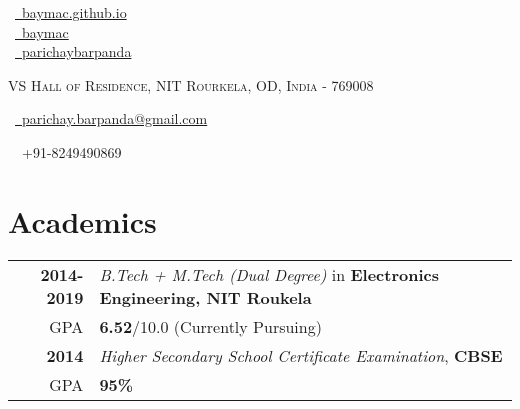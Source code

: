 \documentclass[a4paper,10pt]{extarticle} %
\begin{document}
\pagestyle{empty} %


\begin{multicols}{3}
\normalsize  \faGlobe\ {\href{https://baymac.github.io/}{\  baymac.github.io}}\\
\normalsize \faGithub\ {\href{https://github.com/baymac}{\  baymac}}\\
\normalsize  \faLinkedinSquare\ {\href{https://www.linkedin.com/in/parichaybarpanda/}{\  parichaybarpanda}}\\
\columnbreak
\normalsize\par{\centering{\huge\textsc{\textcolor{primary}{Parichay Barpanda}}}\par} %
\par{\centering\normalsize {\textsc{VS Hall of Residence, NIT Rourkela, OD, India - 769008}}\hfill\par}
\columnbreak
\raggedright\hfill\normalsize \faEnvelope\ {\href{mailto:parichay.barpanda@gmail.com}{\  parichay.barpanda@gmail.com}}\\
\raggedright\hfill{\faPhone\ \  +91-8249490869}
\end{multicols}


\vspace{-0.6cm}
\section{\textcolor{primary}{Academics}}

\begin{tabular}{r|p{17.5cm}}	
\textbf{2014-2019} & \textit{B.Tech + M.Tech (Dual Degree)} in \textbf{Electronics Engineering, NIT Roukela}\\
\hfill GPA & \textbf{6.52}/10.0 (Currently Pursuing) \\
\textbf{2014} & \textit{Higher Secondary School Certificate Examination}, \textbf{CBSE}\\
\hfill GPA & \textbf{95\%}\\
\end{tabular}
\end{document}

